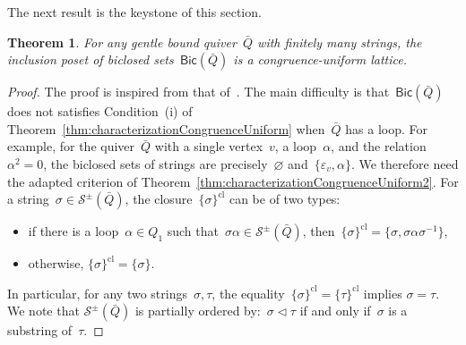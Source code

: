 \documentclass{amsart}
\newtheorem{theorem}{Theorem}[part]
\theoremstyle{definition}
\newcommand{\strings}{\mathcal{S}} %
\newcommand{\closure}[1]{#1^{\mathrm{cl}}} %
\newcommand{\Bicl}[1]{\mathsf{Bic}(#1)} %
\begin{document}
The next result is the keystone of this section.

\begin{theorem}
For any gentle bound quiver~$\bar Q$ with finitely many strings, the inclusion poset of biclosed sets~$\Bicl{\bar Q}$ is a congruence-uniform lattice.
\end{theorem}

\begin{proof}
The proof is inspired from that of~\cite[Thm.~6.5]{McConville}.
The main difficulty is that~$\Bicl{\bar Q}$ does not satisfies Condition~(i) of Theorem~\ref{thm:characterizationCongruenceUniform} when~$\bar Q$ has a loop.
For example, for the quiver~$\bar Q$ with a single vertex~$v$, a loop~$\alpha$, and the relation~$\alpha^2 = 0$, the biclosed sets of strings are precisely~$\varnothing$ and~$\{\varepsilon_v, \alpha\}$.
We therefore need the adapted criterion of Theorem~\ref{thm:characterizationCongruenceUniform2}.
For a string~$\sigma \in \strings^\pm(\bar Q)$, the closure~$\closure{\{\sigma\}}$ can be of two types:
\begin{itemize}
\item if there is a loop~$\alpha \in Q_1$ such that~$\sigma \alpha \in \strings^\pm(\bar Q)$, then~$\closure{\{\sigma\}} = \{\sigma, \sigma \alpha \sigma^{-1}\}$,
\item otherwise, $\closure{\{\sigma\}} = \{\sigma\}$.
\end{itemize}
In particular, for any two strings~$\sigma, \tau$, the equality~$\closure{\{\sigma\}}=\closure{\{\tau\}}$ implies $\sigma=\tau$.
We note that $\strings^\pm(\bar Q)$ is partially ordered by:~$\sigma \vartriangleleft \tau$ if and only if~$\sigma$ is a substring of~$\tau$.


\end{proof}
\end{document}
